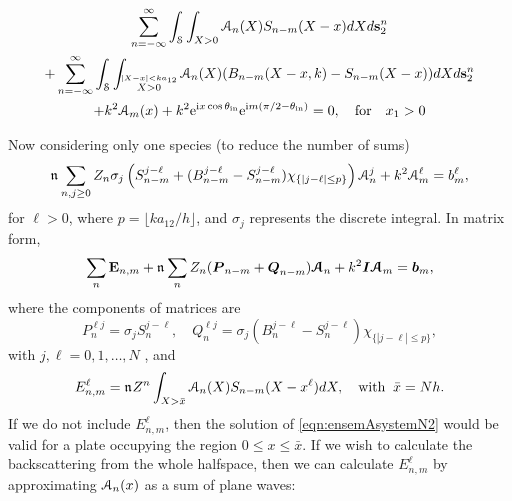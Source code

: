 \documentclass[12pt, a4paper]{article}
\begin{document}
\begin{multline}
  \sum_{n=-\infty}^\infty
  \int_\mathcal S \int_{X>0} \mathcal A_n (X) S_{n-m}(X-x) dX
  d\mathbf s_2^n
  \\
  +  \sum_{n=-\infty}^\infty
    \int_\mathcal S \int_{\stackrel{|X-x| < k a_{12}}{X>0}} \mathcal A_n (X) (B_{n-m}(X- x,k) - S_{n-m}(X-x) )dX
    d\mathbf s_2^n
\\
+  k^2 \mathcal A_m (x)   + k^2  \textrm{e}^{\textrm{i} x \cos \theta_{\mathrm{in}}} \textrm{e}^{\textrm{i} m ( \pi/2 - \theta_{\mathrm{in}} )}
   = 0, \quad \text{for} \quad x_1 >0
  \label{eqn:ensemAsystem4}
\end{multline}

Now considering only one species (to reduce the number of sums)
\begin{equation}
  \mathfrak n_{} \sum_{n,j \geq 0}  Z_n  \sigma_j  \left ( S_{n-m}^{j-\ell}
  +  (B_{n-m}^{j-\ell} - S_{n-m}^{j -\ell} ) \chi_{\{|j-\ell|\leq p\}} \right) \mathcal A_n^j+  k^2  \mathcal A_m^\ell  =  b_m^\ell,
  \label{eqn:ensemAsystemN}
\end{equation}
for $\ell >0$, where $p = \lfloor k a_{12}/h \rfloor$, and $\sigma_j$ represents the discrete integral. In matrix form,
\begin{equation}
  \sum_{n} \mathbf E_{n,m}
+ \mathfrak n_{} \sum_{n}  Z_n ( \boldsymbol{P}_{n-m} + \boldsymbol{Q}_{n-m}) \boldsymbol{\mathcal A}_n
+  k^2 \boldsymbol{I} \boldsymbol{\mathcal A}_m  =  \boldsymbol{b}_m,
  \label{eqn:ensemAsystemN2}
\end{equation}
where the components of matrices are
\begin{equation}
  P_{n}^{\ell j} =  \sigma_j S_{n}^{j-\ell}, \quad Q_{n}^{\ell j} = \sigma_j (B_{n}^{j-\ell} - S_{n}^{j -\ell} ) \chi_{\{|j-\ell| \leq p\}},
\end{equation}
with $j,\ell = 0,1, \ldots, N$
, and
\begin{equation}
  E_{n,m}^\ell  = \mathfrak n_{} Z^n \int_{X>\bar x} \mathcal A_n (X) S_{n-m}(X-x^\ell) dX, \quad \text{with} \;\; \bar x = Nh.
  \label{eqn:E}
\end{equation}
If we do not include $E_{n,m}^\ell$, then the solution of \eqref{eqn:ensemAsystemN2} would be valid for a plate occupying the region $0 \leq x \leq \bar x$. If we wish to calculate the backscattering from the whole halfspace, then we can calculate $E_{n,m}^\ell$ by approximating $\mathcal A_n(x)$ as a sum of plane waves:
\end{document}
